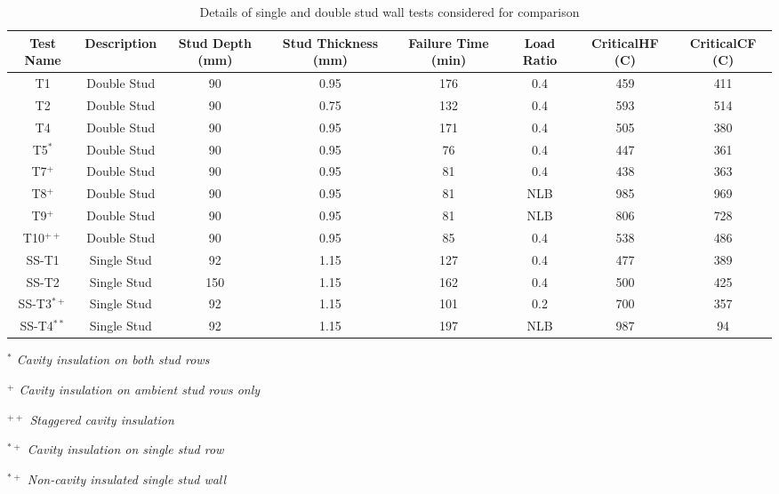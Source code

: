 \begin{table}
	\begin{threeparttable}
		\centering
		\caption{Details of single and double stud wall tests considered for comparison}
		\begin{tabular}{cccccccc}
			\toprule
			\multicolumn{1}{p{2.5em}}{\centering Test Name} & 
			\multicolumn{1}{p{5.3em}}{\centering Description} & 
			\multicolumn{1}{p{2.5em}}{\centering Stud Depth (mm)} & 
			\multicolumn{1}{p{4.3em}}{\centering Stud Thickness (mm)} & 
			\multicolumn{1}{p{2.5em}}{\centering Failure Time (min)} & 
			\multicolumn{1}{p{2.5em}}{\centering Load Ratio} & 
			\multicolumn{1}{p{3.3em}}{\centering Critical\newline{}HF \centering \newline{}(\degree C)} & 
			\multicolumn{1}{p{3.3em}}{\centering Critical\newline{}CF \centering \newline{}(\degree C)} \\
			\midrule
			T1 & Double Stud & 90 & 0.95 & 176 & 0.4  & 459 & 411 \\
			T2 & Double Stud & 90 & 0.75 & 132 & 0.4  & 593 & 514 \\
			T4 & Double Stud & 90 & 0.95 & 171 & 0.4  & 505 & 380 \\
			T5\(^{*}\) & Double Stud & 90 & 0.95 & 76 & 0.4  & 447 & 361 \\
			T7\(^{+}\) & Double Stud & 90 & 0.95 & 81 & 0.4  & 438 & 363 \\
			T8\(^{+}\) & Double Stud & 90 & 0.95 & 81 & NLB  & 985 & 969 \\
			T9\(^{+}\) & Double Stud & 90 & 0.95 & 81 & NLB  & 806 & 728 \\
			T10\(^{++}\) & Double Stud & 90 & 0.95 & 85 & 0.4  & 538 & 486 \\
			SS-T1 & Single Stud & 92 & 1.15 & 127 & 0.4  & 477 & 389 \\
			SS-T2 & Single Stud & 150 & 1.15 & 162 & 0.4  & 500 & 425 \\
			SS-T3\(^{*+}\) & Single Stud & 92 & 1.15 & 101 & 0.2  & 700 & 357 \\
			SS-T4\(^{**}\) & Single Stud & 92 & 1.15 & 197 & NLB  & 987 & 94 \\
			\bottomrule
		\end{tabular}
			\label{tab:comparison-single}
				\begin{tablenotes}
					\small
					\item \textit{\(^{*}\) Cavity insulation on both stud rows}
					\item \textit{\(^{+}\) Cavity insulation on ambient stud rows only}
					\item \textit{\(^{++}\) Staggered cavity insulation}
					\item \textit{\(^{*+}\) Cavity insulation on single stud row}
					\item \textit{\(^{*+}\) Non-cavity insulated single stud wall}
				\end{tablenotes}
	\end{threeparttable}
\end{table}

